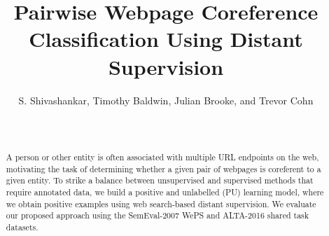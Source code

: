 \documentclass[letterpaper]{sig-alternate-2013}
\begin{document}
\title{Pairwise Webpage Coreference Classification Using Distant Supervision}


\author{
\alignauthor 
	S. Shivashankar, Timothy Baldwin, Julian Brooke, and Trevor Cohn \\
	 \\ 
	 \\
}

\maketitle
\begin{abstract}
  A person or other entity is often associated with multiple URL endpoints on the web, motivating the task of determining whether a given pair of webpages is coreferent to a given entity. To strike a balance between unsupervised and supervised methods that require annotated data, we build a positive and unlabelled (PU) learning model, where we obtain positive examples using web search-based distant supervision.  We evaluate our proposed approach using the SemEval-2007 WePS and ALTA-2016 shared task datasets.







\end{abstract}
\end{document}
